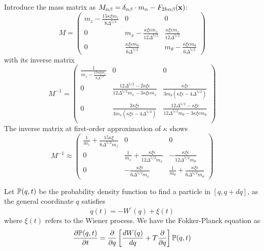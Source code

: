 \documentclass[fleqn,10pt]{InternshipReport_SI-ENS-PSL}
\begin{document}
Introduce the mass matrix as $M_{\alpha\beta} = \delta_{\alpha\beta} \cdot m_\alpha - F_{2h\alpha\beta}(\bbf{x})$:
$$ M = \left(
\begin{array}{ccc}
 m_z-\frac{15 \kappa  \xi  m_z}{8 \Delta ^{5/2}} & 0 & 0 \\
 0 & m_x -\frac{\kappa  \xi  \epsilon  m_x}{12 \Delta ^{5/2}} & \frac{\kappa  \xi  \epsilon  m_x}{12 \Delta ^{5/2}} \\
 0 & \frac{\kappa  \xi  \epsilon  m_{\theta }}{6 \Delta ^{5/2}} & m_{\theta }-\frac{\kappa  \xi  \epsilon  m_{\theta }}{6 \Delta ^{5/2}} 
\end{array} \right) $$
with its inverse matrix 
$$ M^{-1} = \left(
\begin{array}{ccc}
 \frac{1}{m_z-\frac{15 \kappa  \xi  m_z}{8 \Delta ^{5/2}}} & 0 & 0 \\
 0 & \frac{12 \Delta ^{5/2}-2 \kappa  \xi  \epsilon }{12 \Delta ^{5/2} m_x-3 \kappa  \xi  \epsilon  m_x} & \frac{\kappa  \xi  \epsilon }{3 m_{\theta } \left(\kappa  \xi  \epsilon -4 \Delta ^{5/2}\right)} \\
 0 & \frac{2 \kappa  \xi  \epsilon }{3 m_x \left(\kappa  \xi  \epsilon -4 \Delta ^{5/2}\right)} & \frac{12 \Delta ^{5/2}-\kappa  \xi  \epsilon }{12 \Delta ^{5/2} m_{\theta }-3 \kappa  \xi  \epsilon  m_{\theta }} \\
\end{array}
\right) $$
The inverse matrix at first-order approximation of $\kappa$ shows
$$ M^{-1} \approx \left(
\begin{array}{ccc}
 \frac{1}{m_z}+\frac{15 \kappa  \xi }{8 \Delta ^{5/2} m_z} & 0 & 0 \\
 0 & \frac{1}{m_x}+\frac{\kappa  \xi  \epsilon }{12 \Delta ^{5/2} m_x} & -\frac{\kappa \xi  \epsilon}{12 \Delta ^{5/2} m_{\theta }} \\
 0 & -\frac{\kappa \xi  \epsilon}{6 \Delta ^{5/2} m_x} & \frac{1}{m_{\theta }}+\frac{\kappa  \xi  \epsilon }{6 \Delta ^{5/2} m_{\theta }} 
\end{array}
\right) $$



Let $\bb{P}(q,t)$ be the probability density function to find a particle in $[q,q+dq]$, as the general coordinate $q$ satisfies
$$ \dot{q}(t) = - W^\prime(q) + \xi (t) $$
where $\xi(t)$ refers to the Wiener process. We have the Fokker-Planck equation as
$$ \pder[\bb{P}(q,t)]{t} = \pder{q} \left[ \frac{dW(q)}{dq} + T \pder{q} \right] \bb{P}(q,t) $$
\end{document}
